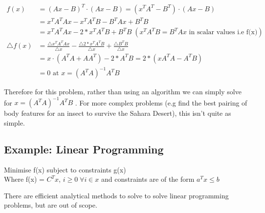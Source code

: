 \begin{align}
    f(x) &= (Ax - B)^T \cdot (Ax - B) = (x^TA^T-B^T) \cdot (Ax-B) \nonumber \\
        &= x^TA^TAx - x^TA^TB - B^TAx + B^TB \nonumber \\
        &= x^TA^TAx - 2* x^TA^TB + B^TB \;(x^TA^TB = B^TAx \text{ in scalar values i.e f(x)}) \nonumber \\
\triangle f(x) &= \frac{\triangle x^TA^TAx}{ \triangle x} - \frac{\triangle 2* x^TA^TB}{ \triangle x} + \frac{\triangle B^TB}{ \triangle x} \nonumber \\  
&= x \cdot (A^TA + AA^T) - 2* A^TB = 2 * ( xA^TA - A^TB) \nonumber \\
&= 0 \text{ at } x = (A^TA)^{-1} A^TB \nonumber 
\end{align}

Therefore for this problem, rather than using an algorithm we can simply solve for \(x = (A^TA)^{-1} A^TB\) . For more complex problems (e.g find the best pairing of body features for an insect to survive the Sahara Desert), this isn't quite as simple.

\subsection{Example: Linear Programming}
\begin{center}
    Minimise f(x) subject to constraints g(x) \\
    Where f(x) = $C^Tx$, $i \geq 0\; \forall i \in x$ and constraints are of the form \(a^Tx \leq b\)
\end{center}
There are efficient analytical methods to solve to solve linear programming problems, but are out of scope.
